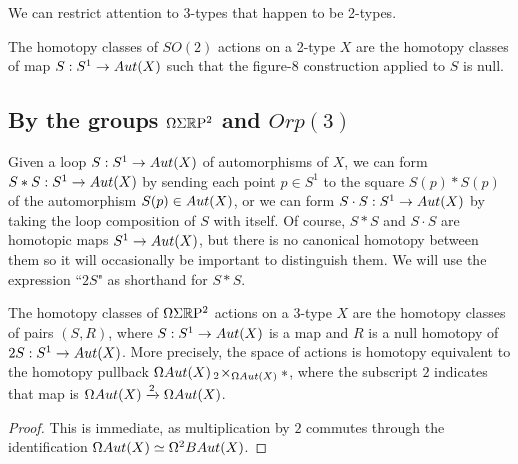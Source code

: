 \documentclass{amsart}
\begin{document}
We can restrict attention to 3-types that happen to be 2-types.
\begin{corollary}
The homotopy classes of $SO(2)$ actions on a 2-type $X$ are the homotopy classes of map $S: S^1 \rightarrow Aut(X)$ such that the figure-8 construction applied to $S$ is null.
\end{corollary}

\subsection{By the groups $\Omega \Sigma \mathbb R \mathrm{P}^2$ and $Orp(3)$}

Given a loop $S: S^1 \rightarrow Aut(X)$ of automorphisms of $X$, we can form $S \ast S : S^1 \rightarrow Aut(X)$ by sending each point $p \in S^1$ to the square $S(p) \ast S(p)$ of the automorphism $S(p) \in Aut(X)$, or we can form $S \cdot S : S^1 \rightarrow Aut(X)$ by taking the loop composition of $S$ with itself.  Of course, $S \ast S$ and $S \cdot S$ are homotopic maps $S^1 \rightarrow Aut(X)$, but there is no canonical homotopy between them so it will occasionally be important to distinguish them.  We will use the expression ``$2S$" as shorthand for $S \ast S$.

\begin{prop} \label{prop-sigmarp2action}
The homotopy classes of $\Omega \Sigma \mathbb R \mathrm{P}^2$ actions on a 3-type $X$ are the homotopy classes of pairs $(S,R)$, where $S: S^1 \rightarrow Aut(X)$ is a map and $R$ is a null homotopy of $2S: S^1 \rightarrow Aut(X)$.  More precisely, the space of actions is homotopy equivalent to the homotopy pullback $\Omega Aut(X) \,_2\!\times_{\Omega Aut(X)} \ast$, where the subscript $2$ indicates that map is $\Omega Aut(X) \xrightarrow{2} \Omega Aut(X)$.
\end{prop}
\begin{proof}
This is immediate, as multiplication by $2$ commutes through the identification $\Omega Aut(X) \simeq \Omega^2 BAut(X)$.
\end{proof}
\end{document}
